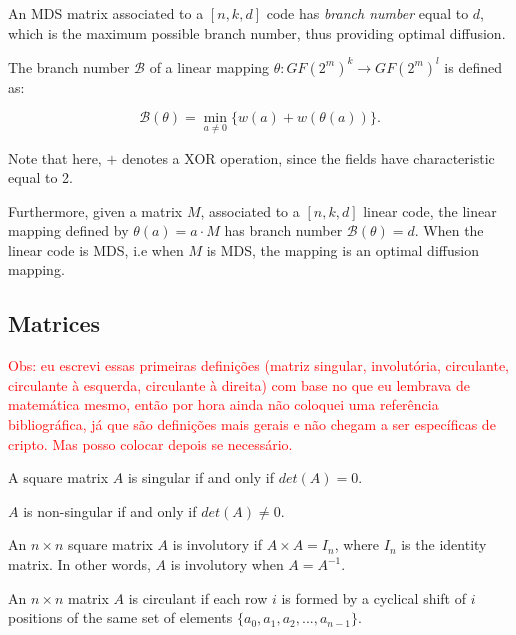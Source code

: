 An MDS matrix associated to a $[n, k, d]$ code has \emph{branch number} equal to $d$, which is the maximum possible branch number, thus providing optimal diffusion.

\begin{definition}
The branch number $\mathcal{B}$ of a linear mapping $\theta: GF(2^m)^k \rightarrow GF(2^m)^l$ is defined as:

$$\mathcal{B}(\theta) = \min_{a\neq0}\{w(a) + w(\theta(a))\}.$$

Note that here, $+$ denotes a XOR operation, since the fields have characteristic equal to 2.

Furthermore, given a matrix $M$, associated to a $[n, k, d]$ linear code, the linear mapping defined by $\theta(a) = a \cdot M$ has branch number $\mathcal{B}(\theta) = d$. When the linear code is MDS, i.e when $M$ is MDS, the mapping is an optimal diffusion mapping.
\end{definition}

\subsection{Matrices}

\textcolor{red}{Obs: eu escrevi essas primeiras definições (matriz singular, involutória, circulante, circulante à esquerda, circulante à direita) com base no que eu lembrava de matemática mesmo, então por hora ainda não coloquei uma referência bibliográfica, já que são definições mais gerais e não chegam a ser específicas de cripto. Mas posso colocar depois se necessário.}

\begin{definition}
A square matrix $A$ is singular if and only if $det(A) = 0$.
\end{definition}

\begin{definition}
$A$ is non-singular if and only if $det(A) \neq 0$.
\end{definition}

\begin{definition}
An $n \times n$ square matrix $A$ is involutory if $A \times A = I_n$, where $I_n$ is the identity matrix. In other words, $A$ is involutory when $A = A^{-1}$.
\end{definition}

\begin{definition}
An $n \times n$ matrix $A$ is circulant if each row $i$ is formed by a cyclical shift of $i$ positions of the same set of elements $\{a_0, a_1, a_2, ..., a_{n-1}\}$.
\end{definition}

